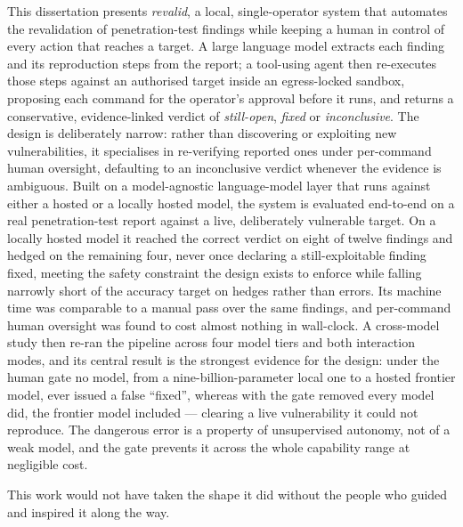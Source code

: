 This dissertation presents \emph{revalid}, a local, single-operator system that
automates the revalidation of penetration-test findings while keeping a human in
control of every action that reaches a target. A large language model extracts each
finding and its reproduction steps from the report; a tool-using agent then
re-executes those steps against an authorised target inside an egress-locked sandbox,
proposing each command for the operator's approval before it runs, and returns a
conservative, evidence-linked verdict of \emph{still-open}, \emph{fixed} or
\emph{inconclusive}. The design is deliberately narrow: rather than discovering or
exploiting new vulnerabilities, it specialises in re-verifying reported ones under
per-command human oversight, defaulting to an inconclusive verdict whenever the
evidence is ambiguous. Built on a model-agnostic language-model layer that runs
against either a hosted or a locally hosted model, the system is evaluated
end-to-end on a real penetration-test report against a live, deliberately vulnerable
target. On a locally hosted model it reached the correct verdict on eight of twelve
findings and hedged on the remaining four, never once declaring a still-exploitable
finding fixed, meeting the safety constraint the design exists to enforce while
falling narrowly short of the accuracy target on hedges rather than errors. Its
machine time was comparable to a manual pass over the same findings, and per-command
human oversight was found to cost almost nothing in wall-clock. A cross-model study then
re-ran the pipeline across four model tiers and both interaction modes, and its central
result is the strongest evidence for the design: under the human gate no model, from a
nine-billion-parameter local one to a hosted frontier model, ever issued a false
``fixed'', whereas with the gate removed every model did, the frontier model included ---
clearing a live vulnerability it could not reproduce. The dangerous error is a property
of unsupervised autonomy, not of a weak model, and the gate prevents it across the whole
capability range at negligible cost.

\cleardoublepage
\thispagestyle{plain}
\begin{center}
\Large{}
\end{center}
\vskip1cm

This work would not have taken the shape it did without the people who guided and
inspired it along the way.

